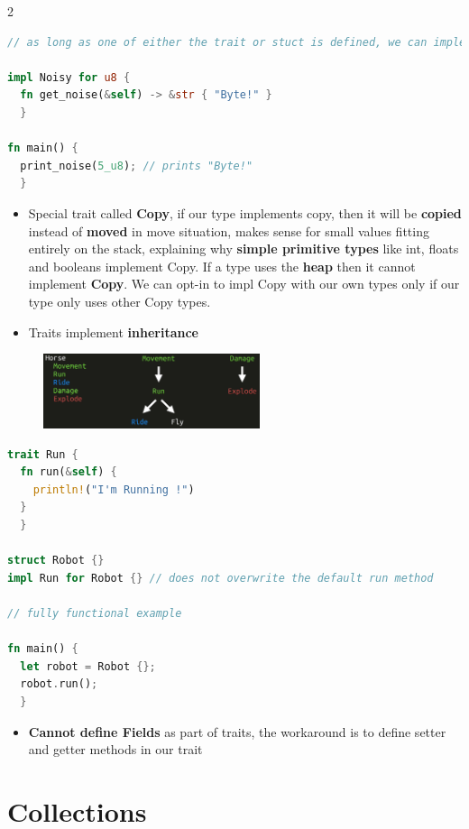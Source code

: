 \documentclass{report}
\begin{document}
\begin{multicols*}{2}
\begin{tcolorbox}[title=Example,colback=backcolour,size=small,left=4mm]
\begin{lstlisting}[language=rust]
  // as long as one of either the trait or stuct is defined, we can implement any trait for any struct, including builtin or import types from other packages

impl Noisy for u8 {
  fn get_noise(&self) -> &str { "Byte!" }
  }

fn main() {
  print_noise(5_u8); // prints "Byte!"
  }
\end{lstlisting}
\end{tcolorbox}

\begin{itemize}
  \item Special trait called \textbf{Copy}, if our type implements copy, then it will be \textbf{copied} instead of \textbf{moved} in move situation,
    makes sense for small values fitting entirely on the stack, explaining why \textbf{simple primitive types} like int, floats and booleans implement Copy. If a type uses the \textbf{heap} then it cannot implement \textbf{Copy}. We can opt-in to impl Copy with our own types only if
    our type only uses other Copy types. 
  \item Traits implement \textbf{inheritance}
\end{itemize}

\begin{figure}[H] 
	 \centering 
	 \includegraphics[width=2.5in]{screenshots/2022-07-17T11-58-25Z.png} 
 \end{figure}


\begin{tcolorbox}[title=Traits can also have default behaviours,colback=backcolour,size=small,left=4mm]
\begin{lstlisting}[language=rust]
trait Run {
  fn run(&self) {
    println!("I'm Running !")
  }
  }

struct Robot {}
impl Run for Robot {} // does not overwrite the default run method

// fully functional example

fn main() {
  let robot = Robot {};
  robot.run();
  }
\end{lstlisting}
\end{tcolorbox}

\begin{itemize}
  \item \textbf{Cannot define Fields} as part of traits, the workaround is to define setter and getter methods in our trait 
\end{itemize}

\section{Collections}

\end{multicols*}
\end{document}
